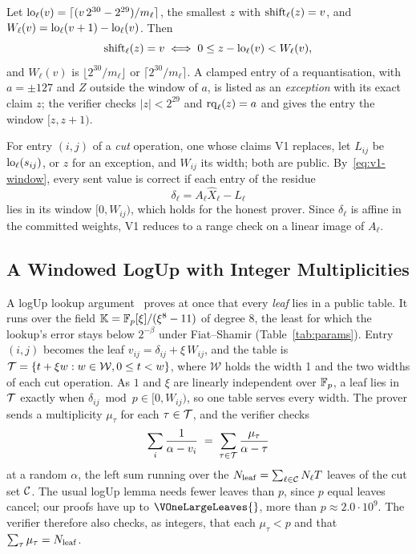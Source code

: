 Let $\mathrm{lo}_\ell(v) = \lceil (v\,2^{30} - 2^{29})/m_\ell \rceil$, the smallest $z$ with
$\mathrm{shift}_\ell(z) = v$, and $W_\ell(v) = \mathrm{lo}_\ell(v+1) - \mathrm{lo}_\ell(v)$. Then
\begin{equation}
  \mathrm{shift}_\ell(z) = v \iff 0 \le z - \mathrm{lo}_\ell(v) < W_\ell(v),
  \label{eq:v1-window}
\end{equation}
and $W_\ell(v)$ is $\lfloor 2^{30}/m_\ell \rfloor$ or $\lceil 2^{30}/m_\ell \rceil$. A clamped
entry of a requantisation, with $a = \pm 127$ and $Z$ outside the window of $a$, is listed as an
\emph{exception} with its exact claim $z$; the verifier checks $|z| < 2^{29}$ and
$\mathrm{rq}_\ell(z) = a$ and gives the entry the window $[z, z+1)$.

For entry $(i,j)$ of a \emph{cut} operation, one whose claims V1 replaces, let $L_{ij}$ be
$\mathrm{lo}_\ell(s_{ij})$, or $z$ for an exception, and $W_{ij}$ its width; both are public.
By~\eqref{eq:v1-window}, every sent value is correct if each entry of the residue
\begin{equation}
  \delta_\ell = A_\ell \hat X_\ell - L_\ell
  \label{eq:v1-residue}
\end{equation}
lies in its window $[0, W_{ij})$, which holds for the honest prover. Since $\delta_\ell$ is affine
in the committed weights, V1 reduces to a range check on a linear image of $A_\ell$.

\subsection{A Windowed LogUp with Integer Multiplicities}

A logUp lookup argument~\cite{haboeck2022logup} proves at once that every \emph{leaf} lies in a
public table. It runs over the field $\mathbb{K} =
\mathbb{F}_p[\xi]/(\xi^8 - 11)$ of degree 8, the least for which the lookup's error stays below $2^{-\beta}$
under Fiat--Shamir (Table~\ref{tab:params}). Entry $(i,j)$ becomes the leaf $v_{ij} = \delta_{ij} +
\xi\,W_{ij}$, and the table is $\mathcal{T} = \{ t + \xi w : w \in \mathcal W, 0 \le t < w \}$, where $\mathcal W$ holds the width 1 and
the two widths of each cut operation. As $1$ and $\xi$ are linearly independent over $\mathbb{F}_p$, a leaf
lies in $\mathcal{T}$ exactly when $\delta_{ij} \bmod p \in [0, W_{ij})$, so one table serves every
width. The prover sends a multiplicity $\mu_\tau$ for each $\tau \in \mathcal{T}$, and the verifier checks
\begin{equation}
  \sum_{i} \frac{1}{\alpha - v_i} \;=\; \sum_{\tau \in \mathcal{T}} \frac{\mu_\tau}{\alpha - \tau}
  \label{eq:v1-logup}
\end{equation}
at a random $\alpha$, the left sum running over the $N_{\mathrm{leaf}} = \sum_{\ell \in \mathcal{C}} N_\ell T$
leaves of the cut set $\mathcal{C}$. The usual logUp lemma needs fewer leaves than $p$, since $p$ equal leaves
cancel; our proofs have up to $\VOneLargeLeaves{}$, more than $p \approx 2.0 \cdot 10^9$. The verifier
therefore also checks, as integers, that each $\mu_\tau < p$ and that $\sum_\tau \mu_\tau = N_{\mathrm{leaf}}$.

